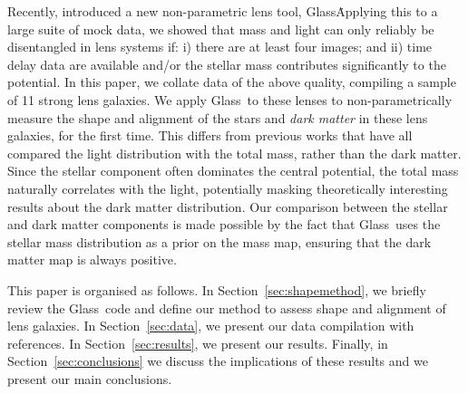 \documentclass[useAMS,usenatbib]{mn2e}
\def\Glass{{\sc Glass}}
\begin{document}

Recently, \citet{2014MNRAS.445.2181C} introduced a new non-parametric lens tool, \Glass\. Applying this to a large suite of mock data, we showed that mass and light can only reliably be disentangled in lens systems if: i) there are at least four images; and ii) time delay data are available and/or the stellar mass contributes significantly to the potential. In this paper, we collate data of the above quality, compiling a sample of 11 strong lens galaxies. We apply \Glass\ to these lenses to non-parametrically measure the shape and alignment of the stars and {\it dark matter} in these lens galaxies, for the first time. This differs from previous works that have all compared the light distribution with the total mass, rather than the dark matter. Since the stellar component often dominates the central potential, the total mass naturally correlates with the light, potentially masking theoretically interesting results about the dark matter distribution. Our comparison between the stellar and dark matter components is made possible by the fact that \Glass\ uses the stellar mass distribution as a prior on the mass map, ensuring that the dark matter map is always positive.

This paper is organised as follows. In Section~\ref{sec:shapemethod}, we briefly review the \Glass\ code and define our method to assess shape and alignment of lens galaxies. In Section~\ref{sec:data}, we present our data compilation with references. In Section~\ref{sec:results}, we present our results. Finally, in Section~\ref{sec:conclusions} we discuss the implications of these results and we present our main conclusions.
\end{document}
